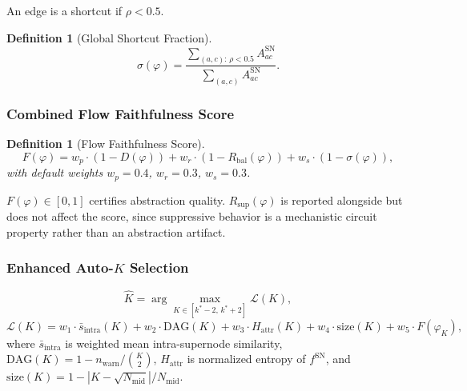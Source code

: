 \documentclass[11pt]{article}
\newtheorem{definition}[theorem]{Definition}
\newcommand{\cL}{\mathcal{L}}
\newcommand{\1}{\mathbbm{1}}
\newcommand{\Rbal}{R_{\mathrm{bal}}(\varphi)}
\newcommand{\Rsup}{R_{\mathrm{sup}}(\varphi)}
\newcommand{\Fphi}{F(\varphi)}
\begin{document}
An edge is a shortcut if $\rho < 0.5$.

\begin{definition}[Global Shortcut Fraction]
  \begin{equation}
    \sigma(\varphi) = \frac{\sum_{(a,c):\, \rho < 0.5} A^{\mathrm{SN}}_{ac}}{\sum_{(a,c)} A^{\mathrm{SN}}_{ac}}.
    \label{eq:sigma-phi}
  \end{equation}
\end{definition}

\subsubsection{Combined Flow Faithfulness Score}
\label{sec:combined}

\begin{definition}[Flow Faithfulness Score]
  \begin{equation}
    F(\varphi) = w_p \cdot (1 - D(\varphi)) + w_r \cdot (1 - \Rbal) + w_s \cdot (1 - \sigma(\varphi)),
    \label{eq:F-phi}
  \end{equation}
  with default weights $w_p = 0.4$, $w_r = 0.3$, $w_s = 0.3$.
\end{definition}

$\Fphi \in [0,1]$ certifies abstraction quality. $\Rsup$ is reported alongside but does not affect the score, since suppressive behavior is a mechanistic circuit property rather than an abstraction artifact.

\subsubsection{Enhanced Auto-$K$ Selection}
\label{sec:auto-k}

\begin{equation}
  \hat{K} = \arg\max_{K \in [k^*-2,\, k^*+2]} \cL(K),
  \label{eq:auto-k}
\end{equation}
\begin{equation}
  \cL(K) = w_1 \cdot \bar{s}_{\mathrm{intra}}(K) + w_2 \cdot \mathrm{DAG}(K) + w_3 \cdot H_{\mathrm{attr}}(K) + w_4 \cdot \mathrm{size}(K) + w_5 \cdot F(\varphi_K),
  \label{eq:score}
\end{equation}
where $\bar{s}_{\mathrm{intra}}$ is weighted mean intra-supernode similarity, $\mathrm{DAG}(K) = 1 - n_{\mathrm{warn}}/\binom{K}{2}$, $H_{\mathrm{attr}}$ is normalized entropy of $f^{\mathrm{SN}}$, and $\mathrm{size}(K) = 1 - |K - \sqrt{N_{\mathrm{mid}}}|/N_{\mathrm{mid}}$.

\end{document}
